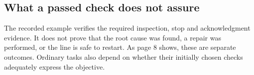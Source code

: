 \subsection*{What a passed check does not assure}
The recorded example verifies the required inspection, stop and acknowledgment evidence. It does not prove that the root cause was found, a repair was performed, or the line is safe to restart. As page 8 shows, these are separate outcomes. Ordinary tasks also depend on whether their initially chosen checks adequately express the objective.

